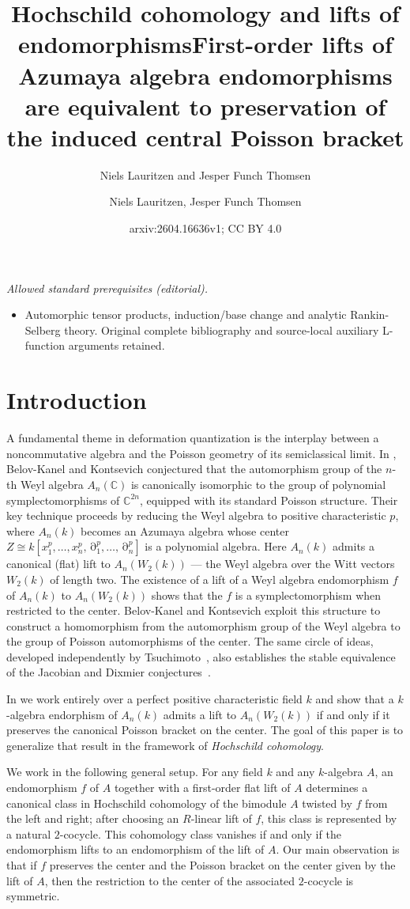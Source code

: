 \documentclass[a4paper,11pt,reqno]{amsart}%
\title{Hochschild cohomology and lifts of endomorphisms}
\author{Niels Lauritzen and Jesper Funch Thomsen}
\title{First-order lifts of Azumaya algebra endomorphisms are equivalent to preservation of the induced central Poisson bracket}
\author{Niels Lauritzen, Jesper Funch Thomsen}
\date{arxiv:2604.16636v1; CC BY 4.0}
\theoremstyle{definition}
\newcommand{\CC}{\mathbb{C}}
\renewcommand{\d}{\operatorname{{\partial}}}
\newcommand{\<}{\<}
\renewcommand{\>}{\>}
\numberwithin{equation}{subsection}
\begin{document}
\maketitle
\noindent\textit{Allowed standard prerequisites (editorial).}\begin{itemize}
\item Automorphic tensor products, induction/base change and analytic Rankin-Selberg theory. Original complete bibliography and source-local auxiliary L-function arguments retained.
\end{itemize}\medskip
\section{Introduction}

A fundamental theme in deformation quantization is the interplay between
a noncommutative algebra and the Poisson geometry of its semiclassical limit.
In \cite{BK}, Belov-Kanel and Kontsevich
conjectured that the automorphism group of the $n$-th Weyl algebra $A_n(\CC)$ 
is canonically isomorphic to the group of polynomial symplectomorphisms 
of $\CC^{2n}$, equipped with its standard Poisson structure.
Their key technique proceeds by 
reducing the Weyl algebra to positive characteristic $p$, 
where $A_n(k)$ becomes an Azumaya algebra whose center 
$Z \cong k[x_1^p, \ldots, x_n^p, \d_1^p, \ldots, \d_n^p]$ 
is a polynomial algebra. Here $A_n(k)$ admits 
a canonical (flat) lift to $A_n(W_2(k))$ --- the 
Weyl algebra over the Witt vectors $W_2(k)$  of length two. The existence of a lift of 
a Weyl algebra endomorphism $f$ of $A_n(k)$ to $A_n(W_2(k))$ shows that the
$f$ is a symplectomorphism when restricted to the center.
Belov-Kanel and Kontsevich exploit this structure to construct a homomorphism from the automorphism 
group of the Weyl algebra to the group of Poisson automorphisms of the center.
The same circle of ideas, developed independently by Tsuchimoto~\cite{Ts}, 
also establishes the stable equivalence of the Jacobian and Dixmier conjectures~\cite{BKJ}.

In \cite{LTL} we work entirely over a perfect positive characteristic field $k$ and show that 
a $k$ -algebra endorphism of $A_n(k)$ admits a lift to $A_n(W_2(k))$ 
if and only if it preserves the canonical Poisson bracket on the center.
 The goal of this paper is to generalize that result in the framework of 
 \emph{Hochschild cohomology}.

We work in the following general setup. 
For any field $k$ and any $k$-algebra $A$, an endomorphism $f$ of $A$ together with a first-order flat lift of $A$ determines a canonical class in Hochschild cohomology of the bimodule $A$
twisted by $f$ from the left and right; after choosing an $R$-linear lift of $f$, this class is represented by a natural $2$-cocycle.
This cohomology class vanishes if and only if 
the endomorphism lifts to an endomorphism of the lift of $A$. 
Our main observation is that if $f$ preserves the center and the 
Poisson bracket on the center given by the lift of $A$, then the restriction to the center of the associated $2$-cocycle is symmetric. 
\end{document}

